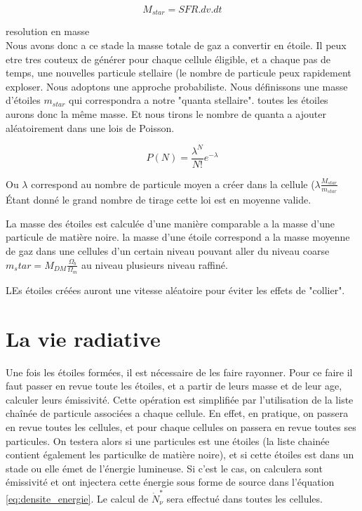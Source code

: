\begin{equation}
	M_{star} = SFR . dv .dt 
\end{equation}

resolution en masse\\

Nous avons donc a ce stade la masse totale de gaz a convertir en étoile.
Il peux etre tres couteux de générer pour chaque cellule éligible, et a chaque pas de temps, une nouvelles particule stellaire (le nombre de particule peux rapidement exploser.
Nous adoptons une approche probabiliste.
Nous définissons une masse d'étoiles $m_{star}$ qui correspondra a notre "quanta stellaire".
toutes les étoiles aurons donc la même masse.
Et nous tirons le nombre de quanta a ajouter aléatoirement dans une lois de Poisson.

\begin{equation}
	P(N) = \frac{\lambda^N}{N!} e^{-\lambda}
\end{equation}

Ou $\lambda$ correspond au nombre de particule moyen a créer dans la cellule ($\lambda \frac{ M_{star}}{m_{star}}$
Étant donné le grand nombre de tirage cette loi est en moyenne valide.

La masse des étoiles est calculée d'une manière comparable a la masse d'une particule de matière noire.
la masse d'une étoile correspond a la masse moyenne de gaz dans une cellules d'un certain niveau pouvant aller du niveau coarse $m_star = M_{DM} \frac{\Omega_b}{\Omega_m}$ au niveau plusieurs niveau raffiné.


LEs étoiles créées auront une vitesse aléatoire pour éviter les effets de "collier".




\section{La vie radiative}

Une fois les étoiles formées, il est nécessaire de les faire rayonner.
Pour ce faire il faut passer en revue toute les étoiles, et a partir de leurs masse et de leur age, calculer leurs émissivité.
Cette opération est simplifiée par l'utilisation de la liste chaînée de particule associées a chaque cellule. %
En effet, en pratique, on passera en revue toutes les cellules, et pour chaque cellules on passera en revue toutes ses particules.
On testera alors si une particules est une étoiles (la liste chainée contient également les particulke de matière noire), et si cette étoiles est dans un stade ou elle émet de l'énergie lumineuse.
Si c'est le cas, on calculera sont émissivité et ont injectera cette énergie sous forme de source dans l'équation \ref{eq:densite_energie}.
Le calcul de $\dot{N}_\nu^*$ sera effectué dans toutes les cellules.

